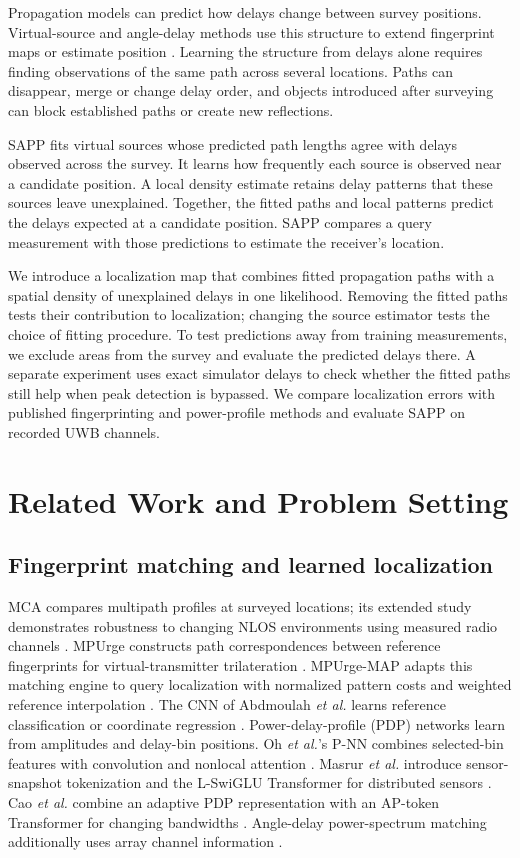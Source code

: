 \documentclass[conference]{IEEEtran}
\begin{document}
Propagation models can predict how delays change between survey positions. Virtual-source and angle-delay methods use this structure to extend fingerprint maps or estimate position \cite{zayets2018interpolation,li2023radiomap,yu2026spatialconsistency}. Learning the structure from delays alone requires finding observations of the same path across several locations. Paths can disappear, merge or change delay order, and objects introduced after surveying can block established paths or create new reflections.

SAPP fits virtual sources whose predicted path lengths agree with delays observed across the survey. It learns how frequently each source is observed near a candidate position. A local density estimate retains delay patterns that these sources leave unexplained. Together, the fitted paths and local patterns predict the delays expected at a candidate position. SAPP compares a query measurement with those predictions to estimate the receiver's location.

We introduce a localization map that combines fitted propagation paths with a spatial density of unexplained delays in one likelihood. Removing the fitted paths tests their contribution to localization; changing the source estimator tests the choice of fitting procedure. To test predictions away from training measurements, we exclude areas from the survey and evaluate the predicted delays there. A separate experiment uses exact simulator delays to check whether the fitted paths still help when peak detection is bypassed. We compare localization errors with published fingerprinting and power-profile methods and evaluate SAPP on recorded UWB channels.

\section{Related Work and Problem Setting}
\subsection{Fingerprint matching and learned localization}
MCA compares multipath profiles at surveyed locations; its extended study demonstrates robustness to changing NLOS environments using measured radio channels \cite{zayets2017mca,zayets2021privacy}. MPUrge constructs path correspondences between reference fingerprints for virtual-transmitter trilateration \cite{abdmoulah2025mpurge}. MPUrge-MAP adapts this matching engine to query localization with normalized pattern costs and weighted reference interpolation \cite{abdmoulah2026mpurgemap}. The CNN of Abdmoulah \emph{et al.} learns reference classification or coordinate regression \cite{abdmoulah2026cnn}. Power-delay-profile (PDP) networks learn from amplitudes and delay-bin positions. Oh \emph{et al.}'s P-NN combines selected-bin features with convolution and nonlocal attention \cite{oh2024pnn}. Masrur \emph{et al.} introduce sensor-snapshot tokenization and the L-SwiGLU Transformer for distributed sensors \cite{masrur2025transforming}. Cao \emph{et al.} combine an adaptive PDP representation with an AP-token Transformer for changing bandwidths \cite{cao2026pdp}. Angle-delay power-spectrum matching additionally uses array channel information \cite{hu2024adps}.
\end{document}
